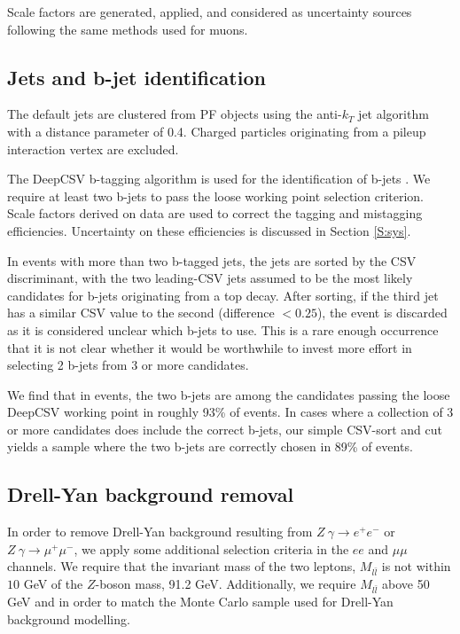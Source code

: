  Scale factors are generated, applied, and considered as uncertainty sources following the same methods used for muons.

\subsection{Jets and b-jet identification}
The default jets are clustered from PF objects using the anti-$k_T$ jet algorithm with a distance parameter of 0.4. Charged particles originating from a pileup interaction vertex are excluded. 

The DeepCSV b-tagging algorithm  is used for the identification of b-jets \cite{deepCSVref}. We require at least two b-jets to pass the loose working point selection criterion. Scale factors derived on data are used to correct the tagging and mistagging efficiencies. Uncertainty on these efficiencies is discussed in Section \ref{S:sys}.

 In events with more than two b-tagged jets, the jets are sorted by the CSV discriminant, with the two leading-CSV jets assumed to be the most likely candidates for b-jets originating from a top decay. After sorting, if the third jet has a similar CSV value to the second (difference $<0.25$), the event is discarded as it is considered unclear which b-jets to use. This is a rare enough occurrence that it is not clear whether it would be worthwhile to invest more effort in selecting 2 b-jets from 3 or more candidates. 
 
 We find that in \ttbar events, the two b-jets are among the candidates passing the loose DeepCSV working point in roughly 93\% of events. In cases where a collection of 3 or more candidates does include the correct b-jets, our simple CSV-sort and cut yields a \ttbar sample where the two b-jets are correctly chosen in 89\% of events.
   


\subsection*{Drell-Yan background removal}

In order to remove Drell-Yan background resulting from $Z\ \gamma \rightarrow e^+e^- $ or $Z \ \gamma \rightarrow \mu^+\mu^-$, we apply some additional selection criteria in the $ee$ and $\mu\mu$ channels. We require that the invariant mass of the two leptons, $M_{l\bar{l}}$ is not within $10$ \unit{GeV} of the $Z$-boson mass, 91.2 \unit{GeV}. Additionally, we require $M_{l\bar{l}}$  above 50\,GeV and in order to match the Monte Carlo sample used for Drell-Yan background modelling. 

